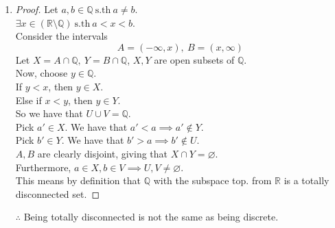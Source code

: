 \documentclass{article}
\newcommand{\sth}{\mathrm{s.th}\ }
\newcommand{\R}{\mathbb{R}}
\newcommand{\Q}{\mathbb{Q}}
\renewcommand{\emptyset}{\varnothing}
\theoremstyle{remark}
\begin{document}
\begin{enumerate}
      \item \begin{proof}
                  Let $a,b \in \Q\ \sth a \neq b$.\\
                  $\exists x \in (\R \setminus \Q) \ \sth a < x < b$.\\
                  Consider the intervals \[A=(-\infty,x),\ B=(x,\infty)\]
                  Let $X = A \cap \Q,\ Y = B \cap \Q$, $X,Y$ are open subsets of $\Q$.\\
                  Now, choose $y \in \Q$.\\
                  If $y < x$, then $y \in X$.\\
                  Else if $x < y$, then $y \in Y$.\\
                  So we have that $U \cup V=\Q$.\\
                  Pick $a' \in X$. We have that $a' < a \implies a' \notin Y$.\\
                  Pick $b' \in Y$. We have that $b' > a \implies b' \notin U$.\\
                  $A,B$ are clearly disjoint, giving that $X \cap Y = \emptyset$.\\
                  Furthermore, $a \in X, b \in V \implies U,V \neq \emptyset$.\\
                  This means by definition that $\Q$ with
                  the subspace top. from $\R$ is a totally disconnected set.
            \end{proof}
            $\therefore$ Being totally disconnected is not the same as being discrete.


\end{enumerate}
\end{document}
